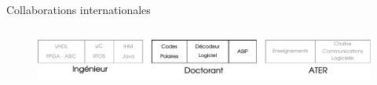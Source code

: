 \documentclass[t,compress,mathserif,12pt,xcolor=dvipsnames]{beamer}
\begin{document}
\begin{frame}[t]{Collaborations internationales}
\begin{minipage}[t][5.0cm][t]{\textwidth}
\begin{columns}[T]
\begin{column}{0.33\textwidth}
      \end{column}
    \end{columns}
  \end{minipage}
  \begin{figure}[htp]
    \centering
    \includegraphics[width=\textwidth]{fig/frise23}
  \end{figure}
\end{frame}
\end{document}
